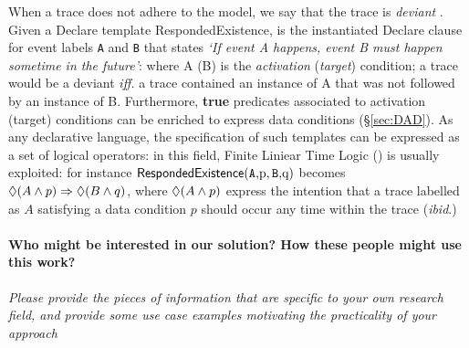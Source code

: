 When a trace does not adhere to the model, we say that the trace is \textit{deviant} \cite{bpm21}. Given a Declare template \textsf{RespondedExistence},  is the instantiated Declare clause for event labels \texttt{A} and \texttt{B} that states \emph{`If event A happens, event B must happen sometime in the future'}: where A (B) is the \textit{activation} (\textit{target}) condition; a trace would be a deviant \emph{iff.} a trace contained an instance of A that was not followed by an instance of B. Furthermore, \textbf{true} predicates associated to activation (target) conditions can be enriched to express data conditions (\S\ref{sec:DAD}). As any declarative language, the specification of such templates can be expressed as a set of logical operators: in this field, Finite Liniear Time Logic (\LTLf) is usually exploited: for instance $\DeclareClause{RespondedExistence}{A}{$p$}{B}{$q$}$ becomes $\lozenge(A\wedge p) \Rightarrow \lozenge(B\wedge q)$, where $\lozenge(A\wedge p)$ express the intention that a trace labelled as $A$ satisfying a data condition $p$ should occur any time within the trace (\textit{ibid}.)

\medskip

\paragraph*{Who might be interested in our solution? How these people might use this work?} \textit{Please provide the pieces of information that are specific to your own research field, and provide some use case examples motivating the practicality of your approach}  

